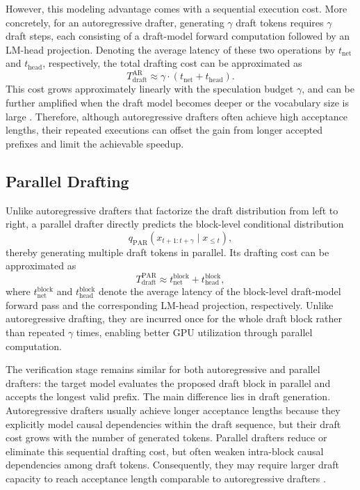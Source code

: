 However, this modeling advantage comes with a sequential execution cost. More concretely, for an autoregressive drafter, generating \(\gamma\) draft tokens requires \(\gamma\) draft steps, each consisting of a draft-model forward computation followed by an LM-head projection. Denoting the average latency of these two operations by \(t_{\mathrm{net}}\) and \(t_{\mathrm{head}}\), respectively, the total drafting cost can be approximated as
\[
T_{\mathrm{draft}}^{\mathrm{AR}}
\approx
\gamma \cdot
\left(
t_{\mathrm{net}} + t_{\mathrm{head}}
\right).
\]
This cost grows approximately linearly with the speculation budget \(\gamma\), and can be further amplified when the draft model becomes deeper or the vocabulary size is large \citep{zhao2025fr,yan2025scaling}. Therefore, although autoregressive drafters often achieve high acceptance lengths, their repeated executions can offset the gain from longer accepted prefixes and limit the achievable speedup.

\subsection{Parallel Drafting}

Unlike autoregressive drafters that factorize the draft distribution from left to right, a parallel drafter \citep{chen2026dflash,liu2026dart} directly predicts the block-level conditional distribution
\[
q_{\mathrm{PAR}}(x_{t+1:t+\gamma} \mid x_{\le t}),
\]
thereby generating multiple draft tokens in parallel. Its drafting cost can be approximated as
\[
T_{\mathrm{draft}}^{\mathrm{PAR}}
\approx
t_{\mathrm{net}}^{\mathrm{block}} + t_{\mathrm{head}}^{\mathrm{block}},
\]
where \(t_{\mathrm{net}}^{\mathrm{block}}\) and \(t_{\mathrm{head}}^{\mathrm{block}}\) denote the average latency of the block-level draft-model forward pass and the corresponding LM-head projection, respectively. Unlike autoregressive drafting, they are incurred once for the whole draft block rather than repeated \(\gamma\) times, enabling better GPU utilization through parallel computation.

The verification stage remains similar for both autoregressive and parallel drafters: the target model evaluates the proposed draft block in parallel and accepts the longest valid prefix. The main difference lies in draft generation. Autoregressive drafters usually achieve longer acceptance lengths because they explicitly model causal dependencies within the draft sequence, but their draft cost grows with the number of generated tokens. Parallel drafters reduce or eliminate this sequential drafting cost, but often weaken intra-block causal dependencies among draft tokens. Consequently, they may require larger draft capacity to reach acceptance length comparable to autoregressive drafters \citep{chen2026dflash}.
